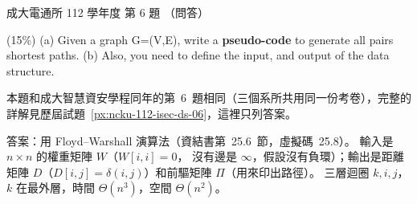 \begin{pastexam}[label={px:ncku-112-cce-ds-06}]{成大電通所 112 學年度 第 6 題}
（問答）

(15\%) (a) Given a graph G=(V,E), write a \textbf{pseudo-code} to generate all pairs shortest
paths. (b) Also, you need to define the input, and output of the data structure.
\end{pastexam}

\begin{pastsoln}
本題和成大智慧資安學程同年的第~6~題相同（三個系所共用同一份考卷），完整的詳解見歷屆試題~\ref{px:ncku-112-isec-ds-06}，這裡只列答案。

答案：用 Floyd--Warshall 演算法（資結書第~25.6~節，虛擬碼~25.8）。 輸入是 $n \times n$ 的權重矩陣 $W$（$W[i, i] = 0$，
沒有邊是 $\infty$，假設沒有負環）；輸出是距離矩陣 $D$（$D[i, j] = \delta(i, j)$）和前驅矩陣 $\Pi$（用來印出路徑）。
三層迴圈 $k, i, j$，$k$ 在最外層，時間 $\Theta(n^3)$，空間 $\Theta(n^2)$。
\end{pastsoln}
